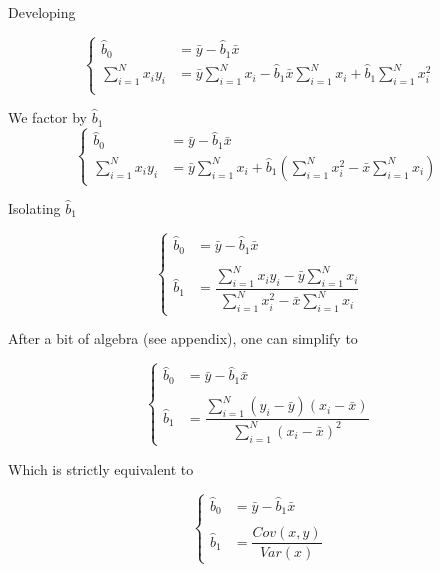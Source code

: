 \documentclass[a4paper,12pt]{article}
\newcommand\bhat[1]{\hat{b}_#1}
\newcommand\sumin{\sum_{i=1}^N}
\begin{document}
Developing

\[
\begin{cases}
	\bhat{0} &= \bar{y} - \bhat{1} \bar{x}\\
	\sumin x_i y_i &= \bar{y} \sumin x_i - \bhat{1} \bar{x} \sumin x_i  + \bhat{1} \sumin x_i^2 \\
\end{cases}
\]

We factor by $\bhat{1}$
\[
\begin{cases}
	\bhat{0} &= \bar{y} - \bhat{1} \bar{x}\\
	\sumin x_i y_i &= \bar{y} \sumin x_i + \bhat{1} \left(\sumin x_i^2 - \bar{x} \sumin x_i \right)\
\end{cases}
\]

Isolating $\bhat{1}$

\[
\begin{cases}
	\bhat{0} &= \bar{y} - \bhat{1} \bar{x}\\
	~ \\
	\bhat{1} &= \dfrac{\sumin x_i y_i - \bar{y} \sumin x_i}{\sumin x_i^2 - \bar{x} \sumin x_i} 
\end{cases}
\]

After a bit of algebra (see appendix), one can simplify to

\[
\begin{cases}
	\bhat{0} &= \bar{y} - \bhat{1} \bar{x}\\
	~ \\
	\bhat{1} &= \dfrac{\sumin (y_i - \bar{y}) (x_i - \bar{x})}{\sumin (x_i - \bar{x})^2}
\end{cases}
\]

Which is strictly equivalent to 

\[
\begin{cases}
	\bhat{0} &= \bar{y} - \bhat{1} \bar{x}\\
	~ \\
	\bhat{1} &= \dfrac{Cov(x,y)}{Var(x)}
\end{cases}
\]
\end{document}
